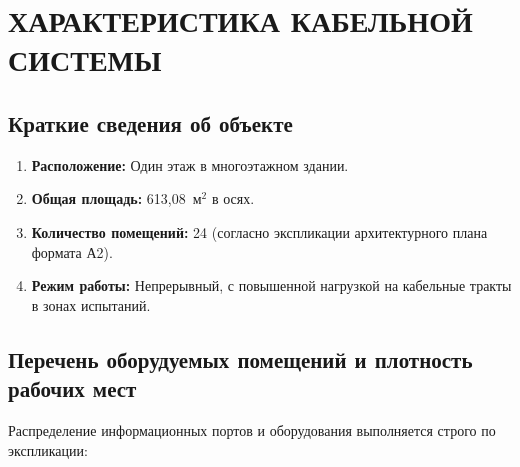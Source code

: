 \documentclass[a4paper,oneside,14pt]{extreport}
\begin{document}

\chapter{ХАРАКТЕРИСТИКА КАБЕЛЬНОЙ СИСТЕМЫ}

\section{Краткие сведения об объекте}
\begin{enumerate}[label=\thesection.\arabic*]
    \item \textbf{Расположение:} Один этаж в многоэтажном здании.
    \item \textbf{Общая площадь:} 613,08~м$^2$ в осях.
    \item \textbf{Количество помещений:} 24 (согласно экспликации архитектурного плана формата А2).
    \item \textbf{Режим работы:} Непрерывный, с повышенной нагрузкой на кабельные тракты в зонах испытаний.
\end{enumerate}

\section{Перечень оборудуемых помещений и плотность рабочих мест}
Распределение информационных портов и оборудования выполняется строго по экспликации:
\end{document}
